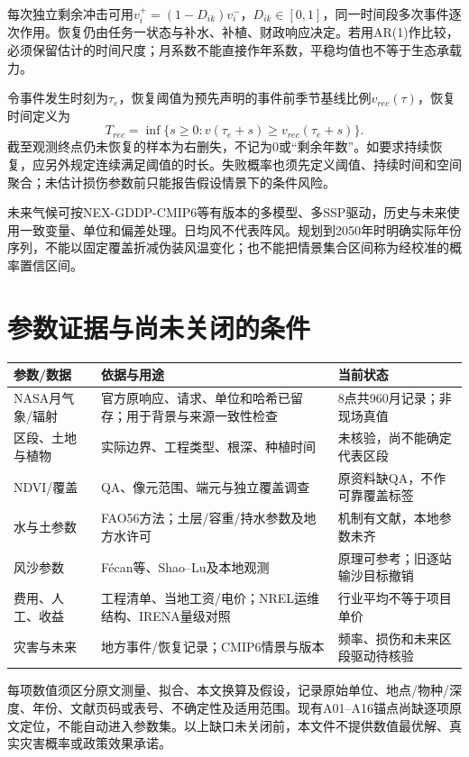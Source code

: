 \documentclass[11pt,a4paper]{ctexart}
\begin{document}
每次独立剩余冲击可用$v_i^+=(1-D_{ik})v_i^-$，$D_{ik}\in[0,1]$，同一时间段多次事件逐次作用。恢复仍由任务一状态与补水、补植、财政响应决定。若用AR(1)作比较，必须保留估计的时间尺度；月系数不能直接作年系数，平稳均值也不等于生态承载力。

令事件发生时刻为$\tau_e$，恢复阈值为预先声明的事件前季节基线比例$v_{rec}(\tau)$，恢复时间定义为
\begin{equation}
 T_{rec}=\inf\{s\geq0:v(\tau_e+s)\geq v_{rec}(\tau_e+s)\}.
\end{equation}
截至观测终点仍未恢复的样本为右删失，不记为0或“剩余年数”。如要求持续恢复，应另外规定连续满足阈值的时长。失败概率也须先定义阈值、持续时间和空间聚合；未估计损伤参数前只能报告假设情景下的条件风险。

未来气候可按NEX-GDDP-CMIP6等有版本的多模型、多SSP驱动，历史与未来使用一致变量、单位和偏差处理。日均风不代表阵风。规划到2050年时明确实际年份序列，不能以固定覆盖折减伪装风温变化；也不能把情景集合区间称为经校准的概率置信区间。

\section{参数证据与尚未关闭的条件}
\noindent\begin{tabularx}{\textwidth}{@{}>{\raggedright\arraybackslash}p{2.8cm}>{\raggedright\arraybackslash}X>{\raggedright\arraybackslash}p{3.3cm}@{}}
\toprule
参数/数据 & 依据与用途 & 当前状态\\
\midrule
NASA月气象/辐射 & 官方原响应、请求、单位和哈希已留存；用于背景与来源一致性检查 & 8点共960月记录；非现场真值\\
区段、土地与植物 & 实际边界、工程类型、根深、种植时间 & 未核验，尚不能确定代表区段\\
NDVI/覆盖 & QA、像元范围、端元与独立覆盖调查 & 原资料缺QA，不作可靠覆盖标签\\
水与土参数 & FAO56方法；土层/容重/持水参数及地方水许可 & 机制有文献，本地参数未齐\\
风沙参数 & F\'ecan等、Shao--Lu及本地观测 & 原理可参考；旧逐站输沙目标撤销\\
费用、人工、收益 & 工程清单、当地工资/电价；NREL运维结构、IRENA量级对照 & 行业平均不等于项目单价\\
灾害与未来 & 地方事件/恢复记录；CMIP6情景与版本 & 频率、损伤和未来区段驱动待核验\\
\bottomrule
\end{tabularx}

每项数值须区分原文测量、拟合、本文换算及假设，记录原始单位、地点/物种/深度、年份、文献页码或表号、不确定性及适用范围。现有A01--A16锚点尚缺逐项原文定位，不能自动进入参数集。以上缺口未关闭前，本文件不提供数值最优解、真实灾害概率或政策效果承诺。
\end{document}
